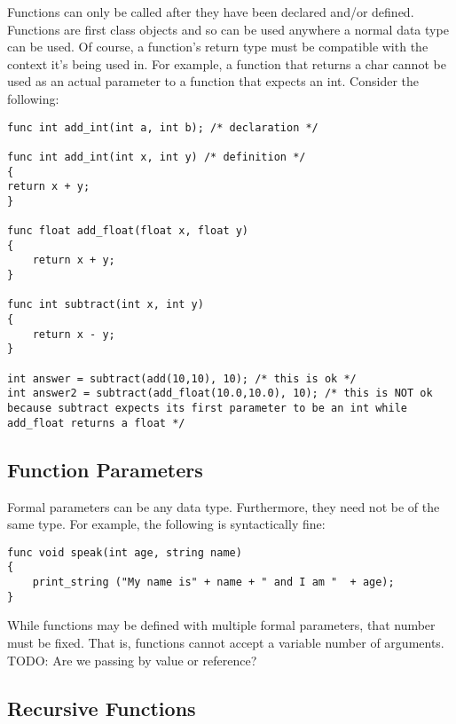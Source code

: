\documentclass{article}
\begin{document}
Functions can only be called after they have been declared and/or defined. Functions are first class objects and so can be used anywhere a normal data type can be used. Of course, a function's return type must be compatible with the context it's being used in. For example, a function that returns a char cannot be used as an actual parameter to a function that expects an int.  Consider the following:

\begin{lstlisting}
func int add_int(int a, int b); /* declaration */

func int add_int(int x, int y) /* definition */
{
return x + y;
}

func float add_float(float x, float y)
{
	return x + y;
}

func int subtract(int x, int y)
{
	return x - y;
}

int answer = subtract(add(10,10), 10); /* this is ok */
int answer2 = subtract(add_float(10.0,10.0), 10); /* this is NOT ok because subtract expects its first parameter to be an int while add_float returns a float */

\end{lstlisting}

\subsection{Function Parameters}
Formal parameters can be any data type. Furthermore, they need not be of the same type. For example, the following is syntactically fine:

\begin{lstlisting}
func void speak(int age, string name)
{
	print_string ("My name is" + name + " and I am "  + age);
}
\end{lstlisting}
While functions may be defined with multiple formal parameters, that number must be fixed. That is, functions cannot accept a variable number of arguments. 
\\
TODO: Are we passing by value or reference?


\subsection{Recursive Functions}
\end{document}
